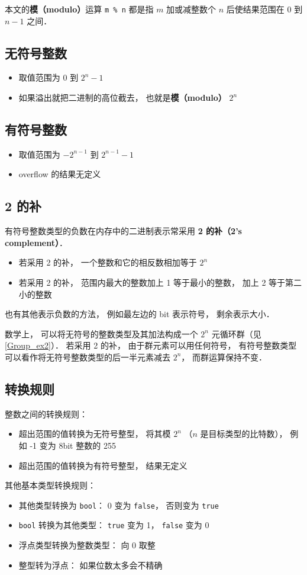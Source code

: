 
本文的\textbf{模（modulo）}运算 \verb|m % n| 都是指 $m$ 加或减整数个 $n$ 后使结果范围在 $0$ 到 $n-1$ 之间．

\subsection{无符号整数}
\begin{itemize}
\item 取值范围为 $0$ 到 $2^n-1$
\item 如果溢出就把二进制的高位截去， 也就是\textbf{模（modulo）} $2^n$
\end{itemize}

\subsection{有符号整数}
\begin{itemize}
\item 取值范围为 $-2^{n-1}$ 到 $2^{n-1}-1$
\item overflow 的结果无定义
\end{itemize}

\subsection{2 的补}
有符号整数类型的负数在内存中的二进制表示常采用 \textbf{2 的补（2's complement）}．
\begin{itemize}
\item 若采用 2 的补， 一个整数和它的相反数相加等于 $2^n$
\item 若采用 2 的补， 范围内最大的整数加上 1 等于最小的整数， 加上 2 等于第二小的整数
\end{itemize}

也有其他表示负数的方法， 例如最左边的 bit 表示符号， 剩余表示大小．

数学上， 可以将无符号的整数类型及其加法构成一个 $2^n$ 元循环群（见\autoref{Group_ex2}）． 若采用 2 的补， 由于群元素可以用任何符号， 有符号整数类型可以看作将无符号整数类型的后一半元素减去 $2^n$， 而群运算保持不变．

\subsection{转换规则}
整数之间的转换规则：
\begin{itemize}
\item 超出范围的值转换为无符号整型， 将其模 $2^n$ （$n$ 是目标类型的比特数）， 例如 -1 变为 8bit 整数的 255
\item 超出范围的值转换为有符号整型， 结果无定义
\end{itemize}
其他基本类型转换规则：
\begin{itemize}
\item 其他类型转换为 \verb|bool|： 0 变为 \verb|false|， 否则变为 \verb|true|
\item \verb|bool| 转换为其他类型： \verb|true| 变为 1， \verb|false| 变为 0
\item 浮点类型转换为整数类型： 向 0 取整
\item 整型转为浮点： 如果位数太多会不精确
\end{itemize}

